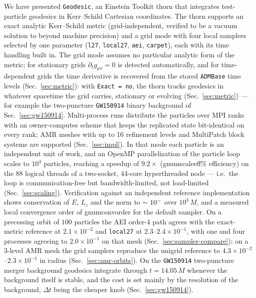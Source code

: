 \documentclass[11pt]{article}
\newcommand{\num}[1]{\csname gnum#1\endcsname}
\begin{document}
We have presented \texttt{Geodesic}, an Einstein Toolkit thorn that
integrates test-particle geodesics in Kerr--Schild Cartesian coordinates.
The thorn supports an exact analytic Kerr--Schild metric (grid-independent,
verified to be a vacuum solution to beyond machine precision) and a grid
mode
with four local samplers selected by one parameter (\texttt{l27},
\texttt{local27}, \texttt{aei}, \texttt{carpet}), each with its time
handling built in.  The grid mode
assumes no particular analytic form of the metric; for stationary grids
$\partial_t g_{\mu\nu} = 0$ is detected automatically, and for
time-dependent grids the time derivative is recovered from the stored
\texttt{ADMBase} time levels (Sec.~\ref{sec:metric}): with
\texttt{Exact = no}, the thorn tracks geodesics in whatever spacetime
the grid carries, stationary or evolving (Sec.~\ref{sec:metric}) ---
for example the two-puncture \texttt{GW150914} binary background of
Sec.~\ref{sec:gw150914}.  Multi-process runs distribute the particles
over MPI ranks with an owner-computes scheme that keeps the replicated
state bit-identical on every rank; AMR meshes with up to 16 refinement
levels and MultiPatch block systems are supported (Sec.~\ref{sec:impl}).  In that mode each particle is an
independent unit of work, and an OpenMP parallelization of the particle loop
scales to $10^4$ particles, reaching a speedup of
$9.2\times$ (\num{scaleeff}\% efficiency) on the 88 logical threads of a
two-socket, 44-core hyperthreaded node --- i.e.\ the loop is
communication-free but bandwidth-limited, not load-limited
(Sec.~\ref{sec:scaling}).  Verification against an
independent reference implementation shows conservation of $E$, $L_z$ and the
norm to $\sim10^{-\num{consexp}}$ over $10^3\,M$, and a measured local
convergence order of \num{convorder} for the default sampler.  On a precessing
orbit of $100$ particles the AEI order-4 path agrees with the exact-metric
reference at $2.1\times10^{-2}$ and \texttt{local27} at
$2.3$--$2.4\times10^{-1}$, with one and four processes agreeing to
$2.0\times10^{-1}$ on that mesh
(Sec.~\ref{sec:sampler-compare}); on a 3-level AMR mesh the grid samplers
reproduce the unigrid reference to $4.3\times10^{-2}$--$2.3\times10^{-1}$ in
radius (Sec.~\ref{sec:amr-orbits}).  On the \texttt{GW150914} two-puncture
merger background geodesics integrate through $t = 14.05\,M$ whenever the
background itself is stable, and the cost is set mainly by the resolution of the
background, $\Delta t$ being the cheaper knob (Sec.~\ref{sec:gw150914}).
\end{document}
